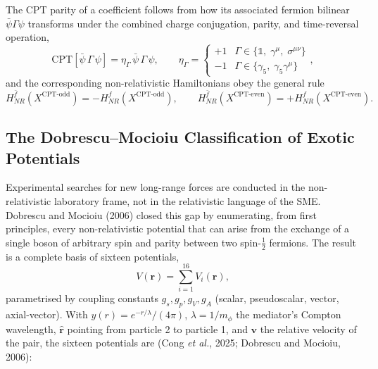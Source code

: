 The CPT parity of a coefficient follows from how its associated fermion
bilinear $\bar\psi\Gamma\psi$ transforms under the combined charge
conjugation, parity, and time-reversal operation,
\begin{equation}
  \mathrm{CPT}\!\left[\bar\psi\,\Gamma\,\psi\right]
  = \eta_\Gamma\,\bar\psi\,\Gamma\,\psi,
  \qquad
  \eta_\Gamma = \begin{cases}
    +1 & \Gamma \in \{\mathbb 1,\; \gamma^\mu,\; \sigma^{\mu\nu}\} \\
    -1 & \Gamma \in \{\gamma_5,\; \gamma_5\gamma^\mu\}
  \end{cases},
\end{equation}
and the corresponding non-relativistic Hamiltonians obey the general rule
\begin{equation}
  H_{NR}^{\bar f}\!\left(X^{\text{CPT-odd}}\right)  = -H_{NR}^{f}\!\left(X^{\text{CPT-odd}}\right),
  \qquad
  H_{NR}^{\bar f}\!\left(X^{\text{CPT-even}}\right) = +H_{NR}^{f}\!\left(X^{\text{CPT-even}}\right).
  \label{eq:cpt-rule-general}
\end{equation}

\subsection{The Dobrescu--Mocioiu Classification of Exotic Potentials}
\label{sec:dm}

Experimental searches for new long-range forces are conducted in the
non-relativistic laboratory frame, not in the relativistic language of the
SME. Dobrescu and Mocioiu (2006) closed this gap by enumerating, from first
principles, every non-relativistic potential that can arise from the
exchange of a single boson of arbitrary spin and parity between two
spin-$\tfrac12$ fermions. The result is a complete basis of sixteen
potentials,
\begin{equation}
  V(\mathbf r) = \sum_{i=1}^{16} V_i(\mathbf r),
\end{equation}
parametrised by coupling constants $g_s,g_p,g_V,g_A$ (scalar, pseudoscalar,
vector, axial-vector). With $y(r)=e^{-r/\lambda}/(4\pi)$,
$\lambda=1/m_\phi$ the mediator's Compton wavelength, $\hat{\mathbf r}$
pointing from particle 2 to particle 1, and $\mathbf v$ the relative
velocity of the pair, the sixteen potentials are (Cong \textit{et al.},
2025; Dobrescu and Mocioiu, 2006):

